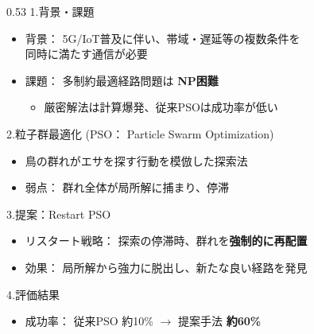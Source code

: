 \documentclass[aspectratio=169, 10pt, t]{beamer}
\begin{document}
\begin{frame}[t]
\begin{columns}[T, onlytextwidth]
        \begin{column}{0.53\textwidth}
            \setlength{\leftmargini}{2.0em} 
            \vspace{0.2cm}
            \textcolor{TextBlack}{1.背景・課題}
            \vspace{-0.1cm}
            \begin{itemize} \setlength{\labelsep}{0.3em} \setlength{\itemsep}{1pt} \setlength{\parskip}{1pt}
                \item 背景： 5G/IoT普及に伴い、帯域・遅延等の複数条件を\\ \vspace{0.04cm}同時に満たす通信が必要
                \item 課題： 多制約最適経路問題は \textbf{\textcolor{AlertRed}{NP困難}} 
                    \begin{itemize} \setlength{\itemsep}{0pt}
                        \item 厳密解法は計算爆発、従来PSOは成功率が低い
                    \end{itemize}
            \end{itemize}

            \textcolor{TextBlack}{2.粒子群最適化 (PSO： Particle Swarm Optimization)}
            \vspace{-0.1cm}
            \begin{itemize} \setlength{\labelsep}{0.3em} \setlength{\itemsep}{1pt} \setlength{\parskip}{1pt}
                \item 鳥の群れがエサを探す行動を模倣した探索法
                \item 弱点： 群れ全体が局所解に捕まり、停滞
            \end{itemize}

            \textcolor{TextBlack}{3.提案：Restart PSO}
            \vspace{-0.1cm}
            \begin{itemize} \setlength{\labelsep}{0.3em} \setlength{\itemsep}{1pt} \setlength{\parskip}{1pt}
                \item リスタート戦略： 探索の停滞時、群れを\textbf{\textcolor{AlertRed}{強制的に再配置}}
                \item 効果： 局所解から強力に脱出し、新たな良い経路を発見
            \end{itemize}

            \textcolor{TextBlack}{4.評価結果}
            \vspace{-0.1cm}
            \begin{itemize} \setlength{\labelsep}{0.3em} \setlength{\itemsep}{1pt} \setlength{\parskip}{1pt}
                \item 成功率： 従来PSO 約10\% $\to$ 提案手法 \textbf{\textcolor{AlertRed}{約60\%}}
            \end{itemize}


\end{column}
\end{columns}
\end{frame}
\end{document}
